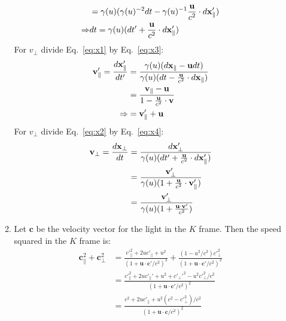 \documentclass[12pt,a4]{article}
\begin{document}
\begin{enumerate}
\begin{enumerate}
\begin{align}
               &= \gamma(u) (\gamma(u)^{-2} dt - \gamma(u)^{-1}\frac{{\bf u}}{c^2} \cdot d {\bf x}'_\parallel)\nonumber\\
          \Rightarrow & dt = \gamma(u) (dt' + \frac{{\bf u}}{c^2} \cdot d {\bf x}'_\parallel) \label{eq:x4}
        \end{align}
        For $v_\perp$ divide Eq.~\ref{eq:x1} by Eq.~\ref{eq:x3}:
        \begin{align*}
          {\bf v}'_\parallel = \frac{d {\bf x}'_\parallel}{d t'}  &= \frac{\gamma (u) (d {\bf x}_\parallel - {\bf u} dt)}{\gamma (u) (d t - \frac{\bf u}{c^2}\cdot d{\bf x}_\parallel)}\\
                                                                  &= \frac{{\bf v}_\parallel - {\bf u} }{1 - \frac{\bf u}{c^2} \cdot {\bf v}}\\
                                                      \Rightarrow &= {\bf v}'_\parallel + {\bf u}
        \end{align*}
        For $v_\perp$ divide Eq.~\ref{eq:x2} by Eq.~\ref{eq:x4}:
        \begin{align*}
          {\bf v}_\perp = \frac{d {\bf x}_\perp}{d t} &= \frac{d {\bf x}'_\perp}{\gamma(u) (dt' + \frac{{\bf u}}{c^2} \cdot d {\bf x}'_\parallel)}\\
                                                      &= \frac{{\bf v}'_\perp}{\gamma (u) (1 + \frac{{\bf u}}{c^2}\cdot {\bf v}'_\parallel)}\\
                                                      &= \frac{{\bf v}'_\perp}{\gamma (u) (1 + \frac{{\bf u}\cdot {\bf v}'}{c^2})}
        \end{align*}
      \item 
        Let $\mathbf{c}$ be the velocity vector for the light in the $K$ frame. 
        Then the speed squared in the $K$ frame is:
        \begin{align*}
          \mathbf{c}_\parallel^2 + \mathbf{c}_\perp^2 &= \frac{{c'}_\parallel^2 + 2 u {c'}_\parallel + u^2}{(1 + \mathbf{u} \cdot \mathbf{c'}/c^2)^2} + \frac{(1 - u^2 / c^2) {c'}_\perp^2}{(1 + \mathbf{u} \cdot \mathbf{c'}/c^2)^2}\\
                                                      &= \frac{{c'}_\parallel^2 + 2 u {c'}_\parallel' + u^2 + {c'}_\perp'^2 - u^2 {c'}_\perp^2/ c^2}{(1 + \mathbf{u} \cdot \mathbf{c'}/c^2)^2}\\
                                                       &= \frac{c^2 + 2 u {c'}_\parallel + u^2(c^2 - {c'}_\perp^2)/ c^2}{(1 + \mathbf{u} \cdot \mathbf{c}/c^2)^2}\\

\end{align*}
\end{enumerate}
\end{enumerate}
\end{document}
